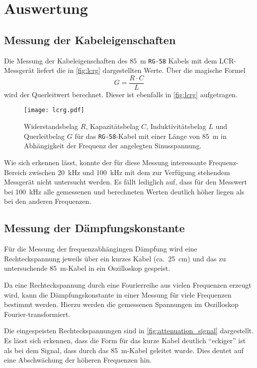\section{Auswertung}
\label{sec:Auswertung}

\subsection{Messung der Kabeleigenschaften}

Die Messung der Kabeleigenschaften des \SI{85}{\meter} \texttt{RG-58} Kabels mit dem LCR-Messgerät liefert die in \autoref{fig:lcrg} dargestellten Werte.
Über die magische Formel~\cite{querleitwert}
\begin{equation}
  G = \frac{R \cdot C}{L}
\end{equation}
wird der Querleitwert berechnet. Dieser ist ebenfalls in \autoref{fig:lcrg} aufgetragen.

\begin{figure}
  \centering
  \texttt{[image: lcrg.pdf]}
  \caption{%
    Widerstandsbelag $R$, Kapazitätsbelag $C$, Induktivitätsbelag $L$ und Querleitbelag $G$ für das \texttt{RG-58}-Kabel mit einer Länge von \SI{85}{\meter} in Abhängigkeit der Frequenz der angelegten Sinusspannung.}
  \label{fig:lcrg}
\end{figure}

Wie sich erkennen lässt, konnte der für diese Messung interessante Frequenz-Bereich zwischen \SI{20}{\kilo\hertz} und \SI{100}{\kilo\hertz} mit dem zur Verfügung stehendem Messgerät nicht untersucht werden.
Es fällt lediglich auf, dass für den Messwert bei \SI{100}{\kilo\hertz} alle gemessenen und berechneten Werten deutlich höher liegen als bei den anderen Frequenzen.

\subsection{Messung der Dämpfungskonstante}

Für die Messung der frequenzabhängingen Dämpfung wird eine Rechteckspannung
jeweils über ein kurzes Kabel (ca.\ \SI{25}{\centi\meter}) und das zu untersuchende \SI{85}{\meter}-Kabel in ein Oszilloskop gespeist.

Da eine Rechteckspannung durch eine Fourierreihe aus vielen Frequenzen erzeugt wird,
kann die Dämpfungskonstante in einer Messung für viele Frequenzen bestimmt werden.
Hierzu werden die gemessenen Spannungen im Oszilloskop Fourier-transformiert.

Die eingespeisten Rechteckspannungen sind in \autoref{fig:attenuation_signal} dargestellt.
Es lässt sich erkennen, dass die Form für das kurze Kabel deutlich \enquote{eckiger} ist als bei dem Signal, dass durch das \SI{85}{\meter}-Kabel geleitet wurde.
Dies deutet auf eine Abschwächung der höheren Frequenzen hin.

